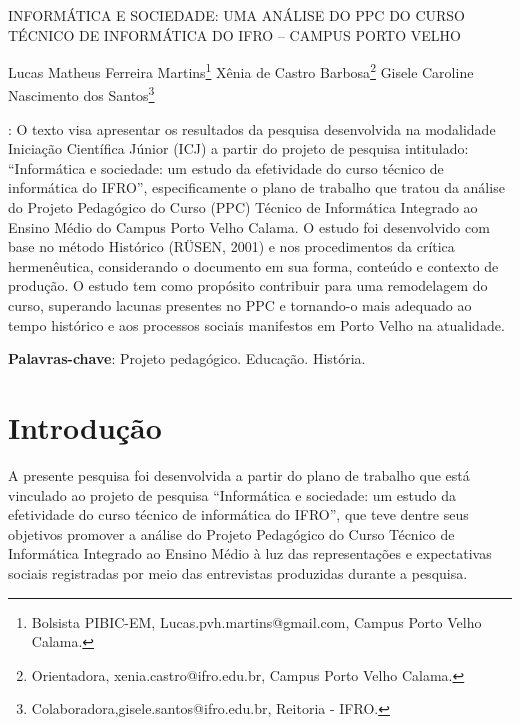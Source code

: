 \documentclass[article,12pt,onesidea,4paper,english,brazil]{abntex2}
\begin{document}
	
	
	\frenchspacing 
	
	\begin{center}
		\LARGE INFORMÁTICA E SOCIEDADE: UMA ANÁLISE DO PPC DO CURSO TÉCNICO DE INFORMÁTICA DO IFRO – CAMPUS PORTO VELHO
		
		\normalsize
	Lucas Matheus Ferreira Martins\footnote{Bolsista PIBIC-EM, Lucas.pvh.martins@gmail.com, Campus Porto Velho Calama.} 
	Xênia de Castro Barbosa\footnote{Orientadora, xenia.castro@ifro.edu.br, Campus Porto Velho Calama.} 
		Gisele Caroline Nascimento dos Santos\footnote{Colaboradora,gisele.santos@ifro.edu.br, Reitoria - IFRO.}  
	\end{center}
	
	\begin{resumoumacoluna}
		: O texto visa apresentar os resultados da pesquisa desenvolvida na modalidade Iniciação Científica Júnior (ICJ) a partir do projeto de pesquisa intitulado: “Informática e sociedade: um estudo da efetividade do curso técnico de informática do IFRO”, especificamente o plano de trabalho que tratou da análise do Projeto Pedagógico do Curso (PPC) Técnico de Informática Integrado ao Ensino Médio do Campus Porto Velho Calama. O estudo foi desenvolvido com base no método Histórico (RÜSEN, 2001) e nos procedimentos da crítica hermenêutica, considerando o documento em sua forma, conteúdo e contexto de produção. O estudo tem como propósito contribuir para uma remodelagem do curso, superando lacunas presentes no PPC e tornando-o mais adequado ao tempo histórico e aos processos sociais manifestos em Porto Velho na atualidade.
		
		\vspace{\onelineskip}
		
		\noindent
		\textbf{Palavras-chave}: Projeto pedagógico. Educação. História.
		
		
	\end{resumoumacoluna}
	
	\section*{Introdução}
	
	A presente pesquisa foi desenvolvida a partir do plano de trabalho que está vinculado ao projeto de pesquisa “Informática e sociedade: um estudo da efetividade do curso técnico de informática do IFRO”, que teve dentre seus objetivos promover a análise do Projeto Pedagógico do Curso Técnico de Informática Integrado ao Ensino Médio à luz das representações e expectativas sociais registradas por meio das entrevistas produzidas durante a pesquisa.
	
\end{document}
